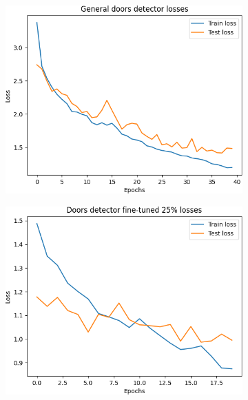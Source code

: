 \begin{figure}[h!]
	\centering
	\begin{subfigure}[b]{0.49\linewidth}
		\includegraphics[width=\linewidth]{images/house13_general_detector_loss.png}

	\end{subfigure}
	\hfil
	\begin{subfigure}[b]{0.49\linewidth}
		\includegraphics[width=\linewidth]{images/house13_finetune25_loss.png}


\end{subfigure}
\end{figure}
